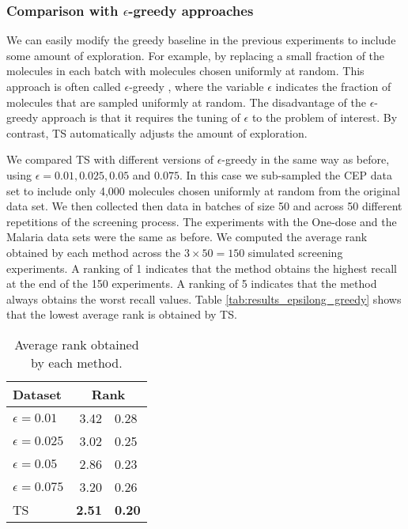 \subsubsection{Comparison with $\epsilon$-greedy approaches}

We can easily modify the greedy baseline in the previous experiments to include some amount of exploration. For example, by replacing a small fraction of the molecules in each batch with molecules chosen uniformly at random. This approach is often called $\epsilon$-greedy \cite{watkins1989learning}, where the variable $\epsilon$ indicates the fraction of molecules that are sampled uniformly at random. The disadvantage of the $\epsilon$-greedy approach is that it requires the tuning of $\epsilon$ to the problem of interest. By contrast, TS automatically adjusts the amount of exploration. 

We compared TS with different versions of $\epsilon$-greedy in the same way as before, using $\epsilon = 0.01, 0.025, 0.05$ and $0.075$. In this case we sub-sampled the CEP data set to include only 4,000 molecules chosen uniformly at random from the original data set. We then collected then data in batches of size 50 and across 50 different repetitions of the screening process. The experiments with the One-dose and the Malaria data sets were the same as before.  We computed the average rank obtained by each method across the $3\times 50 = 150$ simulated screening experiments. A ranking of 1 indicates that the method obtains the highest recall at the end of the 150 experiments. A ranking of 5 indicates that the method always obtains the worst recall values. Table \ref{tab:results_epsilong_greedy} shows that the lowest average rank is obtained by TS. 

\begin{table}
\centering
\caption{Average rank obtained by each method.}\label{tab:results_epsilon_greedy}
\begin{tabular}{lr@{$\pm$}l}
\hline
\bf{Dataset}& \multicolumn{2}{c}{\bf{Rank}}\\
\hline
$\epsilon = 0.01$ & 3.42 & 0.28 \\
$\epsilon = 0.025$ & 3.02 & 0.25 \\
$\epsilon = 0.05$ & 2.86 & 0.23 \\
$\epsilon = 0.075$ & 3.20 & 0.26 \\
TS & \bf{ 2.51 }&\bf{ 0.20 } \\
\hline
\end{tabular}
\end{table}